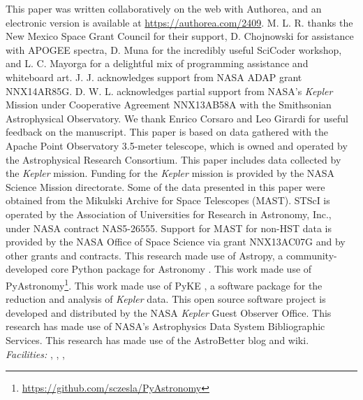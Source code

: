 \acknowledgments
This paper was written collaboratively on the web with Authorea, and an electronic version is available at \url{https://authorea.com/2409}. M. L. R. thanks the New Mexico Space Grant Council for their support, D. Chojnowski for assistance with APOGEE spectra, D. Muna for the incredibly useful SciCoder workshop, and L. C. Mayorga for a delightful mix of programming assistance and whiteboard art. J. J. acknowledges support from NASA ADAP grant NNX14AR85G. D. W. L. acknowledges partial support from NASA's \emph{Kepler} Mission under Cooperative Agreement NNX13AB58A with the Smithsonian Astrophysical Observatory. We thank Enrico Corsaro and Leo Girardi for useful feedback on the manuscript. This paper is based on data gathered with the Apache Point Observatory 3.5-meter telescope, which is owned and operated by the Astrophysical Research Consortium. This paper includes data collected by the \emph{Kepler} mission. Funding for the \emph{Kepler} mission is provided by the NASA Science Mission directorate. Some of the data presented in this paper were obtained from the Mikulski Archive for Space Telescopes (MAST). STScI is operated by the Association of Universities for Research in Astronomy, Inc., under NASA contract NAS5-26555. Support for MAST for non-HST data is provided by the NASA Office of Space Science via grant NNX13AC07G and by other grants and contracts. This research made use of Astropy, a community-developed core Python package for Astronomy \citep{astropy}. This work made use of PyAstronomy\footnote{\url{https://github.com/sczesla/PyAstronomy}}. This work made use of PyKE \citep{pyke}, a software package for the reduction and analysis of \emph{Kepler} data. This open source software project is developed and distributed by the NASA \emph{Kepler} Guest Observer Office. This research has made use of NASA's Astrophysics Data System Bibliographic Services. This research has made use of the AstroBetter blog and wiki.
\\

{\it Facilities:} , , , 

  
  
  
  
  
  